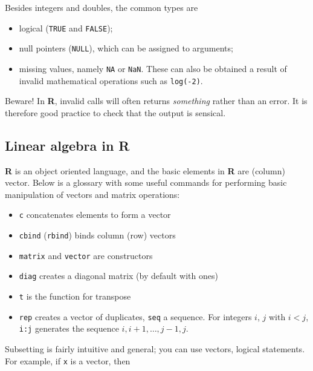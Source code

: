 \documentclass[
  11pt,
  letterpaper,
]{book}
\providecommand{\tightlist}{%
  \setlength{\itemsep}{0pt}\setlength{\parskip}{0pt}}
\theoremstyle{definition}
\theoremstyle{definition}
\theoremstyle{definition}
\theoremstyle{remark}
\begin{document}
Besides integers and doubles, the common types are

\begin{itemize}
\tightlist
\item
  logical (\texttt{TRUE} and \texttt{FALSE});
\item
  null pointers (\texttt{NULL}), which can be assigned to arguments;
\item
  missing values, namely \texttt{NA} or \texttt{NaN}. These can also be obtained a result of invalid mathematical operations such as \texttt{log(-2)}.
\end{itemize}

Beware! In \textbf{R}, invalid calls will often returns \emph{something} rather than an error. It is therefore good practice to check that the output is sensical.

\hypertarget{linear-algebra-in-r}{%
\subsection{\texorpdfstring{Linear algebra in \textbf{R}}{Linear algebra in R}}\label{linear-algebra-in-r}}

\textbf{R} is an object oriented language, and the basic elements in \textbf{R} are (column) vector. Below is a glossary with some useful commands for performing basic manipulation of vectors and matrix operations:

\begin{itemize}
\tightlist
\item
  \texttt{c} concatenates elements to form a vector
\item
  \texttt{cbind} (\texttt{rbind}) binds column (row) vectors
\item
  \texttt{matrix} and \texttt{vector} are constructors
\item
  \texttt{diag} creates a diagonal matrix (by default with ones)
\item
  \texttt{t} is the function for transpose
\item
  \texttt{rep} creates a vector of duplicates, \texttt{seq} a sequence. For integers \(i\), \(j\) with \(i<j\), \texttt{i:j} generates the sequence \(i, i+1, \ldots, j-1, j\).
\end{itemize}

Subsetting is fairly intuitive and general; you can use vectors, logical statements. For example, if \texttt{x} is a vector,
then
\end{document}
